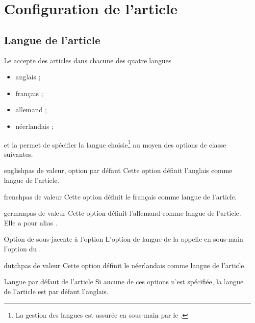\documentclass[english,nolocaltoc]{nwejmart}
\newtheorem[style=definition]{fait}
\newtheorem[title=expérience]{experience}
\newtheorem[title-plural=anneaux]{anneau}
\newtheorem[title=idéal,title-plural=idéaux]{ideal}
\begin{document}
\section{Configuration de l'article}

\subsection{Langue de l'article}
\label{sec:langue-de-larticle}

Le \nwejm{} accepte des articles dans chacune des quatre langues
\begin{itemize}
\item anglais ;
\item français ;
\item allemand ;
\item néerlandais ;
\end{itemize}
et la \nwejmauthorcl{} permet de spécifier la langue choisie\footnote{La gestion
  des langues est assurée en sous-main par le .} au moyen des
options de classe suivantes.

\begin{docKey}{english}{}{pas de valeur, option par défaut}
  Cette option définit l'anglais comme langue de l'article.
\end{docKey}
\begin{docKey}{french}{}{pas de valeur}
  Cette option définit le français comme langue de l'article.
\end{docKey}
\begin{docKey}{german}{}{pas de valeur}
  Cette option définit l'allemand comme langue de l'article. Elle a pour alias
  .
  \begin{dbremark}{Option de  sous-jacente à l'option
      \protect{}}{}
    L'option de langue  de la \nwejmauthorcl{} appelle en
    sous-main l'option  du .
  \end{dbremark}
\end{docKey}
\begin{docKey}{dutch}{}{pas de valeur}
  Cette option définit le néerlandais comme langue de l'article.
\end{docKey}

\begin{dbremark}{Langue par défaut de l'article}{}
  Si aucune de ces options n'est spécifiée, la langue de l'article est par
  défaut l'anglais.
\end{dbremark}
\end{document}
